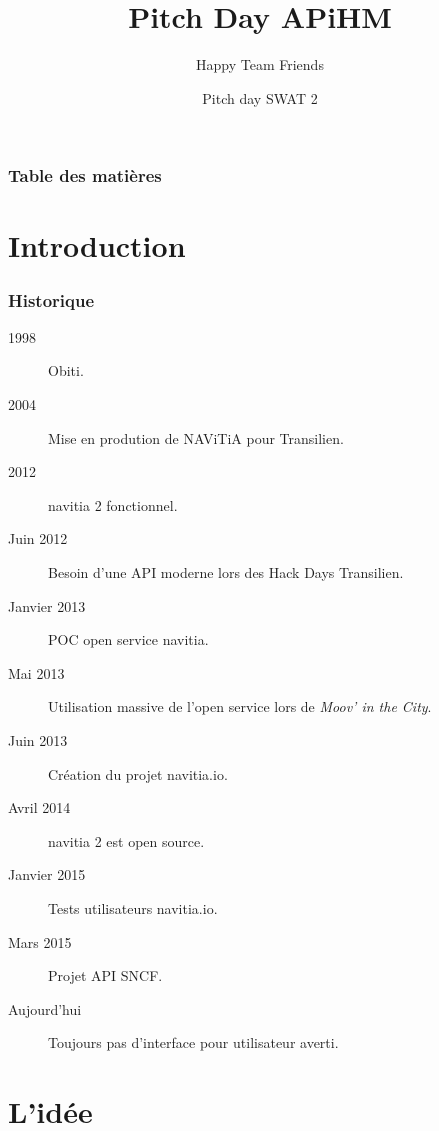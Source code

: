 \documentclass[table]{beamer}
\title{Pitch Day APiHM}
\author{Happy Team Friends}
\institute[Kisio Digital] %
{
  Kisio Digital\\
  20 rue Hector Malot\\
  75012 Paris, France}
\date{Pitch day SWAT 2}
\begin{document}
\begin{frame}
  \titlepage
\end{frame}

\begin{frame}%
  \frametitle{Table des matières}
  \tableofcontents[hideallsubsections]
\end{frame}

\section{Introduction}

\begin{frame}
  \frametitle{Historique}

  \begin{description}
  \item[1998] Obiti.
  \item[2004] Mise en prodution de NAViTiA pour Transilien.
  \item[2012] navitia 2 fonctionnel.
  \item[Juin 2012] Besoin d'une API moderne lors des Hack Days Transilien.
  \item[Janvier 2013] POC open service navitia.
  \item[Mai 2013] Utilisation massive de l'open service lors de
    \emph{Moov' in the City}.
  \item[Juin 2013] Création du projet navitia.io.
  \item[Avril 2014] navitia 2 est open source.
  \item[Janvier 2015] Tests utilisateurs navitia.io.
  \item[Mars 2015] Projet API SNCF.\pause
  \item[Aujourd'hui] Toujours pas d'interface pour utilisateur averti.
  \end{description}
\end{frame}

\section{L'idée}

\end{document}

